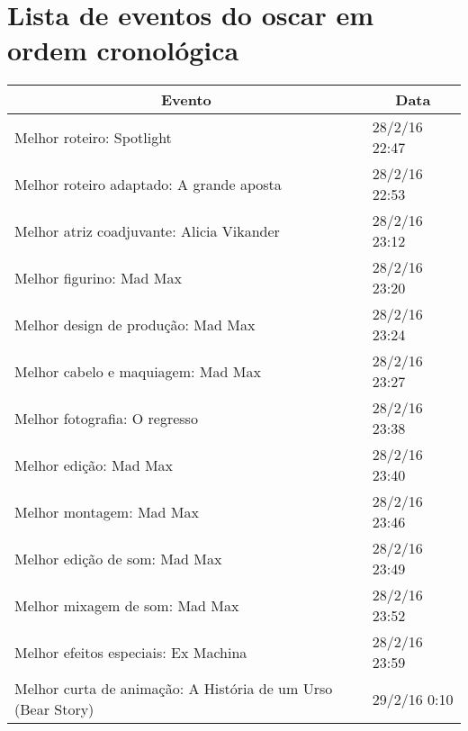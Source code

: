 \chapter{Lista de eventos do oscar em ordem cronol\'{o}gica}
\begin{table}[H]
	\centering
	\label{oscar-timeline}
	\begin{tabular}{|l|l|}
		\hline
		\multicolumn{1}{|c|}{Evento}                                                       & \multicolumn{1}{c|}{Data} \\ \hline
		Melhor roteiro: Spotlight                                                          & 28/2/16 22:47             \\ \hline
		Melhor roteiro adaptado: A grande aposta                                           & 28/2/16 22:53             \\ \hline
		Melhor atriz coadjuvante: Alicia Vikander                                          & 28/2/16 23:12             \\ \hline
		Melhor figurino: Mad Max                                                           & 28/2/16 23:20             \\ \hline
		Melhor design de produ\c{c}\~{a}o: Mad Max                                                 & 28/2/16 23:24             \\ \hline
		Melhor cabelo e maquiagem: Mad Max                                                 & 28/2/16 23:27             \\ \hline
		Melhor fotografia: O regresso                                                      & 28/2/16 23:38             \\ \hline
		Melhor edi\c{c}\~{a}o: Mad Max                                                             & 28/2/16 23:40             \\ \hline
		Melhor montagem: Mad Max                                                           & 28/2/16 23:46             \\ \hline
		Melhor edi\c{c}\~{a}o de som: Mad Max                                                      & 28/2/16 23:49             \\ \hline
		Melhor mixagem de som: Mad Max                                                     & 28/2/16 23:52             \\ \hline
		Melhor efeitos especiais: Ex Machina                                               & 28/2/16 23:59             \\ \hline
		Melhor curta de anima\c{c}\~{a}o: A Hist\'{o}ria de um Urso (Bear Story)                       & 29/2/16 0:10              \\ \hline

\end{tabular}
\end{table}
